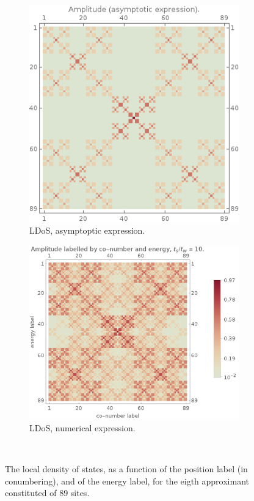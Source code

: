 \documentclass[aps,prl,preprint]{revtex4-1}
\begin{document}
\begin{figure}[htp]
\centering
\begin{subfigure}{.5\textwidth}
  \centering
  \includegraphics[width=.75\textwidth]{img/amplitude_asym.png}
  \caption{LDoS, asymptoptic expression.}
  \label{fig:wf_idos_asym}
\end{subfigure}%
\begin{subfigure}{.5\textwidth}
  \centering
  \includegraphics[width=1.\textwidth]{img/wf_idos.png}
  \caption{LDoS, numerical expression.}
  \label{fig:wf_idos_num}
\end{subfigure} \\
\caption{The local density of states, as a function of the position label (in conumbering), and of the energy label, for the eigth approximant constituted of 89 sites.}
\label{fig:wf_idos}
\end{figure}
\end{document}
